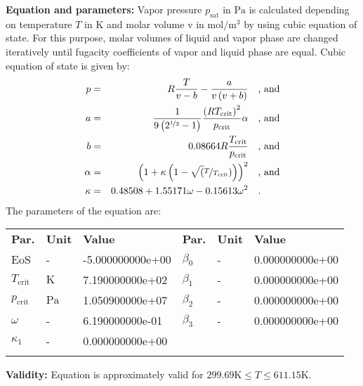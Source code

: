 \textbf{Equation and parameters:}
\newline
%
Vapor pressure $p_\mathrm{sat}$ in $\si{\pascal}$ is calculated depending on temperature $T$ in $\si{\kelvin}$ and molar volume v in $\si{\mole\per\cubic\meter}$ by using cubic equation of state. For this purpose, molar volumes of liquid and vapor phase are changed iteratively until fugacity coefficients of vapor and liquid phase are equal. Cubic equation of state is given by:
\begin{equation*}
\begin{split}
p &=& R \frac{T}{v - b} - \frac{a}{v \left(v + b\right)} & \quad\text{, and} \\
a &=& \frac{1}{9 \left(2^{\nicefrac{1}{3}} - 1\right)} \frac{\left(R T_\mathrm{crit} \right)^2}{p_\mathrm{crit}} \alpha & \quad\text{, and} \\
b &=& 0.08664 R \frac{T_\mathrm{crit}}{p_\mathrm{crit}} & \quad\text{, and} \\
\alpha &=& \left(1 + \kappa \left(1 - \sqrt(\nicefrac{T}{T_\mathrm{crit}}) \right) \right)^2 & \quad\text{, and} \\
\kappa &=& 0.48508 + 1.55171 \omega - 0.15613 \omega^2 & \quad\text{.}
\end{split}
\end{equation*}
%
The parameters of the equation are:
%
\begin{longtable}[l]{lll|lll}
\toprule
\addlinespace
\textbf{Par.} & \textbf{Unit} & \textbf{Value} &	\textbf{Par.} & \textbf{Unit} & \textbf{Value} \\
\addlinespace
\midrule
\endhead

\bottomrule
\endfoot
\bottomrule
\endlastfoot
\addlinespace

EoS & - & -5.000000000e+00 & $\beta_0$ & - & 0.000000000e+00 \\
$T_\mathrm{crit}$ & $\si{\kelvin}$ & 7.190000000e+02 & $\beta_1$ & - & 0.000000000e+00 \\
$p_\mathrm{crit}$ & $\si{\pascal}$ & 1.050900000e+07 & $\beta_2$ & - & 0.000000000e+00 \\
$\omega$ & - & 6.190000000e-01 & $\beta_3$ & - & 0.000000000e+00 \\
$\kappa_1$ & - & 0.000000000e+00 & & & \\

\addlinespace\end{longtable}

\textbf{Validity:}
\newline
Equation is approximately valid for $299.69 \si{\kelvin} \leq T \leq 611.15 \si{\kelvin}$.
\newline

